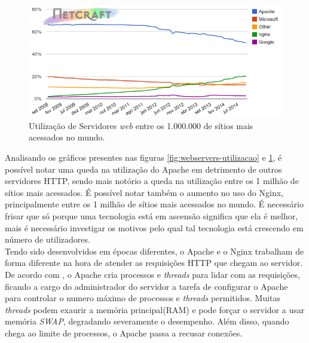 \begin{figure}[htb]
	\centering
	\includegraphics[width=0.6\linewidth]{figuras/grafico2} 
	\caption{Utilização de Servidores \textit{web} entre os 1.000.000 de sítios 
	mais acessados no mundo.}
	\label{fig:webservers-utilizacao-milhao}
\end{figure}
Analisando os gráficos presentes nas figuras \ref{fig:webservers-utilizacao} e 
\ref{fig:webservers-utilizacao-milhao}, é possível notar uma queda na 
utilização do Apache em detrimento de outros servidores HTTP, sendo mais 
notório a queda na utilização entre os 1 milhão de sítios mais acessados. É 
possível notar também o aumento no uso do Nginx, principalmente entre os 1 
milhão de sítios mais acessados no mundo. É necessário frisar que só porque uma 
tecnologia está em ascensão significa que ela é melhor, mais é necessário 
investigar os motivos pelo qual tal tecnologia está crescendo em número de 
utilizadores.\\
Tendo sido desenvolvidos em épocas diferentes, o Apache e o Nginx trabalham de 
forma diferente na hora de atender as requisições HTTP que chegam ao servidor.\\
De acordo com , o Apache cria processos e \textit{threads} 
para lidar com as requisições, ficando a cargo do administrador do servidor a 
tarefa de configurar o Apache para controlar o numero máximo de processos e 
\textit{threads} permitidos. Muitas \textit{threads} podem exaurir a memória 
principal(RAM) e pode forçar o servidor a usar memória \textit{SWAP}, 
degradando severamente o desempenho. Além disso, quando chega ao limite de 
processos, o Apache passa a recusar conexões.
